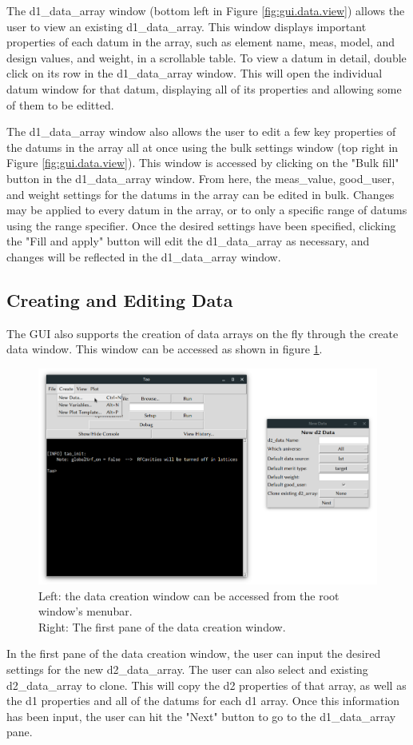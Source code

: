 The d1_data_array window (bottom left in Figure \ref{fig:gui.data.view}) allows the user to view an existing d1_data_array.
This window displays important properties of each datum in the array, such as element name, meas, model, and design values, and weight, in a scrollable table.
To view a datum in detail, double click on its row in the d1_data_array window.
This will open the individual datum window for that datum, displaying all of its properties and allowing some of them to be editted.

The d1_data_array window also allows the user to edit a few key properties of the datums in the array all at once using the bulk settings window (top right in Figure \ref{fig:gui.data.view}).
This window is accessed by clicking on the "Bulk fill" button in the d1_data_array window.
From here, the meas_value, good_user, and weight settings for the datums in the array can be edited in bulk.
Changes may be applied to every datum in the array, or to only a specific range of datums using the range specifier.
Once the desired settings have been specified, clicking the "Fill and apply" button will edit the d1_data_array as necessary, and changes will be reflected in the d1_data_array window.

\subsection{Creating and Editing Data}
\label{s:gui.data.edit}

The GUI also supports the creation of data arrays on the fly through the create data window.
This window can be accessed as shown in figure \ref{fig:gui.create.data.d2}.
\begin{figure}
\centering
\includegraphics[width=12cm]{figures/create_d2.png}
\caption{Left: the data creation window can be accessed from the root window's menubar. \\
Right: The first pane of the data creation window.}
\label{fig:gui.create.data.d2}
\end{figure}
In the first pane of the data creation window, the user can input the desired settings for the new d2_data_array.
The user can also select and existing d2_data_array to clone.
This will copy the d2 properties of that array, as well as the d1 properties and all of the datums for each d1 array.
Once this information has been input, the user can hit the "Next" button to go to the d1_data_array pane.

